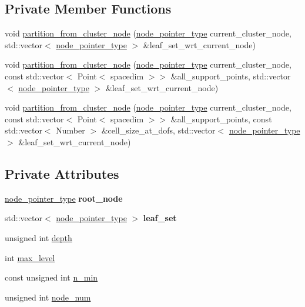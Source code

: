\subsection*{Private Member Functions}
\begin{DoxyCompactItemize}
\item 
void \hyperlink{classClusterTree_a8b650f0c7cc83adbde5aad9556a57ac3}{partition\+\_\+from\+\_\+cluster\+\_\+node} (\hyperlink{classClusterTree_ae4bb0fdc7ac559d7844d04a00ab3e9de}{node\+\_\+pointer\+\_\+type} current\+\_\+cluster\+\_\+node, std\+::vector$<$ \hyperlink{classClusterTree_ae4bb0fdc7ac559d7844d04a00ab3e9de}{node\+\_\+pointer\+\_\+type} $>$ \&leaf\+\_\+set\+\_\+wrt\+\_\+current\+\_\+node)
\item 
void \hyperlink{classClusterTree_a6d3636b1686d72909611a6d516f5ee47}{partition\+\_\+from\+\_\+cluster\+\_\+node} (\hyperlink{classClusterTree_ae4bb0fdc7ac559d7844d04a00ab3e9de}{node\+\_\+pointer\+\_\+type} current\+\_\+cluster\+\_\+node, const std\+::vector$<$ Point$<$ spacedim $>$$>$ \&all\+\_\+support\+\_\+points, std\+::vector$<$ \hyperlink{classClusterTree_ae4bb0fdc7ac559d7844d04a00ab3e9de}{node\+\_\+pointer\+\_\+type} $>$ \&leaf\+\_\+set\+\_\+wrt\+\_\+current\+\_\+node)
\item 
void \hyperlink{classClusterTree_a8b853c36834044df5283fca9e03d39d2}{partition\+\_\+from\+\_\+cluster\+\_\+node} (\hyperlink{classClusterTree_ae4bb0fdc7ac559d7844d04a00ab3e9de}{node\+\_\+pointer\+\_\+type} current\+\_\+cluster\+\_\+node, const std\+::vector$<$ Point$<$ spacedim $>$$>$ \&all\+\_\+support\+\_\+points, const std\+::vector$<$ Number $>$ \&cell\+\_\+size\+\_\+at\+\_\+dofs, std\+::vector$<$ \hyperlink{classClusterTree_ae4bb0fdc7ac559d7844d04a00ab3e9de}{node\+\_\+pointer\+\_\+type} $>$ \&leaf\+\_\+set\+\_\+wrt\+\_\+current\+\_\+node)
\end{DoxyCompactItemize}
\subsection*{Private Attributes}
\begin{DoxyCompactItemize}
\item 
\mbox{\label{classClusterTree_a47a5916039b17a75cda800520ac130b6}} 
\hyperlink{classClusterTree_ae4bb0fdc7ac559d7844d04a00ab3e9de}{node\+\_\+pointer\+\_\+type} {\bfseries root\+\_\+node}
\item 
\mbox{\label{classClusterTree_aa53275a95d4085912bde71f85ef39067}} 
std\+::vector$<$ \hyperlink{classClusterTree_ae4bb0fdc7ac559d7844d04a00ab3e9de}{node\+\_\+pointer\+\_\+type} $>$ {\bfseries leaf\+\_\+set}
\item 
unsigned int \hyperlink{classClusterTree_a051df20340ed3f0e4bc0ee1fb1119f9f}{depth}
\item 
int \hyperlink{classClusterTree_a77800bb9f86c689821ba4d549ce97a58}{max\+\_\+level}
\item 
const unsigned int \hyperlink{classClusterTree_a2c1aa1755a2c06056b4d6b32ec35dba5}{n\+\_\+min}
\item 
unsigned int \hyperlink{classClusterTree_a6b352489be3ca9217d31966c24ee02a1}{node\+\_\+num}
\end{DoxyCompactItemize}
